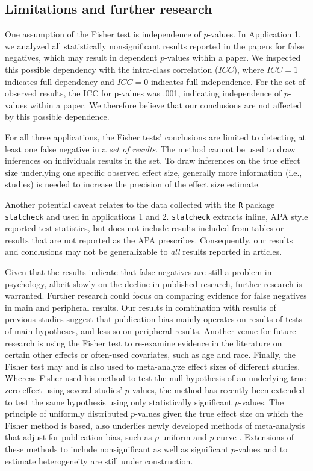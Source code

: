 \documentclass{article}
\begin{document}
\subsection*{Limitations and further research}

One assumption of the Fisher test is independence of $p$-values. In Application 1, we analyzed all statistically nonsignificant results reported in the papers for false negatives, which may result in dependent $p$-values within a paper. We inspected this possible dependency with the intra-class correlation ($ICC$), where $ICC=1$ indicates full dependency and $ICC=0$ indicates full independence. For the set of observed results, the ICC for p-values was .001, indicating independence of $p$-values within a paper. We therefore believe that our conclusions are not affected by this possible dependence.

For all three applications, the Fisher tests' conclusions are limited to detecting at least one false negative in a \textit{set of results}. The method cannot be used to draw inferences on individuals results in the set. To draw inferences on the true effect size underlying one specific observed effect size, generally more information (i.e., studies) is needed to increase the precision of the effect size estimate.

Another potential caveat relates to the data collected with the \texttt{R} package \texttt{statcheck} and used in applications 1 and 2. \texttt{statcheck} extracts inline, APA style reported test statistics, but does not include results included from tables or results that are not reported as the APA prescribes. Consequently, our results and conclusions may not be generalizable to \textit{all} results reported in articles. 

Given that the results indicate that false negatives are still a problem in psychology, albeit slowly on the decline in published research, further research is warranted. Further research could focus on comparing evidence for false negatives in main and peripheral results. Our results in combination with results of previous studies suggest that publication bias mainly operates on results of tests of main hypotheses, and less so on peripheral results. Another venue for future research is using the Fisher test to re-examine evidence in the literature on certain other effects or often-used covariates, such as age and race. Finally, the Fisher test may and is also used to meta-analyze effect sizes of different studies. Whereas Fisher used his method to test the null-hypothesis of an underlying true zero effect using several studies’ $p$-values, the method has recently been extended to test the same hypothesis using only statistically significant $p$-values. The principle of uniformly distributed $p$-values given the true effect size on which the Fisher method is based, also underlies newly developed methods of meta-analysis that adjust for publication bias, such as $p$-uniform \cite{Van_Assen2015-gg} and $p$-curve \cite{Simonsohn2014-dm}. Extensions of these methods to include nonsignificant as well as significant $p$-values and to estimate heterogeneity are still under construction.
\end{document}
